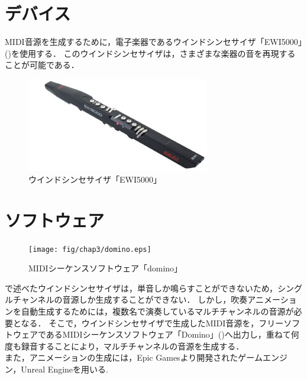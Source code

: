 \section{デバイス} \label{sec:device}
MIDI音源を生成するために，電子楽器であるウインドシンセサイザ「EWI5000」()を使用する．
このウインドシンセサイザは，さまざまな楽器の音を再現することが可能である．
\begin{figure}[h]
	\centering
	\includegraphics[width=8cm]{fig/chap3/ewi.eps}
	\caption{ウインドシンセサイザ「EWI5000」}
	\label{fig:ewi}
\end{figure}

\section{ソフトウェア} \label{sec:software}
\begin{figure}[h]
	\centering
	\texttt{[image: fig/chap3/domino.eps]}
	\caption{MIDIシーケンスソフトウェア「domino」}
	\label{fig:domino}
\end{figure}
で述べたウインドシンセサイザは，単音しか鳴らすことができないため，シングルチャンネルの音源しか生成することができない．
しかし，吹奏アニメーションを自動生成するためには，複数名で演奏しているマルチチャンネルの音源が必要となる．
そこで，ウインドシンセサイザで生成したMIDI音源を，フリーソフトウェアであるMIDIシーケンスソフトウェア「Domino」()\cite{domino}へ出力し，重ねて何度も録音することにより，マルチチャンネルの音源を生成する．\\
\indent
また，アニメーションの生成には，Epic Gamesより開発されたゲームエンジン，Unreal Engine\cite{ue4}を用いる.

